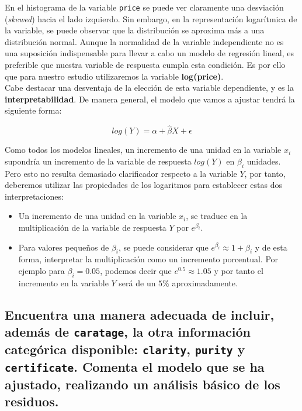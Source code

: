 \documentclass[a4paper, 9pt]{article}
\begin{document}
En el histograma de la variable \texttt{price} se puede ver claramente una desviación (\textit{skewed}) hacia el lado izquierdo. Sin embargo, en la representación logarítmica de la variable, se puede observar que la distribución se aproxima más a una distribución normal. Aunque la normalidad de la variable independiente no es una suposición indispensable para llevar a cabo un modelo de regresión lineal, es preferible que nuestra variable de respuesta cumpla esta condición. Es por ello que para nuestro estudio utilizaremos la variable \textbf{log(price)}. \\

Cabe destacar una desventaja de la elección de esta variable dependiente, y es la \textbf{interpretabilidad}. De manera general, el modelo que vamos a ajustar tendrá la siguiente forma:

\begin{equation}
    log(Y) = \alpha + \widehat{\beta}X + \epsilon
\end{equation}

Como todos los modelos lineales, un incremento de una unidad en la variable $x_i$ supondría un incremento de la variable de respuesta $log(Y)$ en $\beta_i$ unidades. Pero esto no resulta demasiado clarificador respecto a la variable $Y$, por tanto, deberemos utilizar las propiedades de los logaritmos para establecer estas dos interpretaciones:

\begin{itemize}
    \item Un incremento de una unidad en la variable $x_i$, se traduce en la multiplicación de la variable de respuesta $Y$ por $e^{\beta_i}$.
    \item Para valores pequeños de $\beta_i$, se puede considerar que $e^{\beta_i} \approx 1 + \beta_i$ y de esta forma, interpretar la multiplicación como un incremento porcentual. Por ejemplo para $\beta_i = 0.05$, podemos decir que $e^{0.5} \approx 1.05$ y por tanto el incremento en la variable $Y$ será de un $5\%$ aproximadamente.
\end{itemize}

\subsection{Encuentra una manera adecuada de incluir, además de \texttt{caratage}, la otra información categórica disponible: \texttt{clarity}, \texttt{purity} y \texttt{certificate}. Comenta el modelo que se ha ajustado, realizando un análisis básico de los residuos.}
\label{subsec:question-2}
\end{document}

